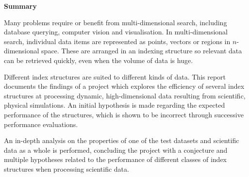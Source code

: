 \begin{center}
    {\LARGE\bf Summary}
\end{center}

Many problems require or benefit from multi-dimensional search, including database querying, computer vision and visualisation. In multi-dimensional search, individual data items are represented as points, vectors or regions in $n$-dimensional space. These are arranged in an indexing structure so relevant data can be retrieved quickly, even when the volume of data is huge.

Different index structures are suited to different kinds of data. This report documents the findings of a project which explores the efficiency of several index structures at processing dynamic, high-dimensional data resulting from scientific, physical simulations. An initial hypothesis is made regarding the expected performance of the structures, which is shown to be incorrect through successive performance evaluations.

An in-depth analysis on the properties of one of the test datasets and scientific data as a whole is performed, concluding the project with a conjecture and multiple hypotheses related to the performance of different classes of index structures when processing scientific data.